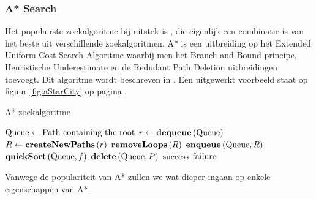 \subsubsection{A* Search}
Het populairste zoekalgoritme bij uitstek is , die eigenlijk een combinatie is van het beste uit verschillende zoekalgoritmen. A* is een uitbreiding op het Extended Uniform Cost Search Algoritme waarbij men het Branch-and-Bound principe, Heuristische Underestimate en de Redudant Path Deletion uitbreidingen toevoegt. Dit algoritme wordt beschreven in . Een uitgewerkt voorbeeld staat op figuur \ref{fig:aStarCity} op pagina \pageref{fig:aStarCity}.
\begin{algorithm}[htb]                      %
\caption{A* zoekalgoritme}          %
\label{alg:aStar}                           %
\begin{algorithmic}[1]                    %
\STATE $\mbox{Queue}\leftarrow\mbox{Path containing the root}$
\WHILE{$\notempty{\queue}\wedge\neg\goalreached{\queue\left[0\right]}$}
\STATE $r\leftarrow\mbox{\bf dequeue}\left( \mbox{Queue} \right)$
\STATE $R\leftarrow\mbox{\bf createNewPaths}\left( r \right)$
\STATE $\mbox{\bf removeLoops}\left( R \right)$
\STATE $\mbox{\bf enqueue}\left( \mbox{Queue},R \right)$
\STATE $\mbox{\bf quickSort}\left( \mbox{Queue},f \right)$
\STATE{}
\STATE $\mbox{\bf delete}\left( \mbox{Queue},P \right)$
\ENDIF
\ENDFOR
\ENDWHILE
\IF{$\goalreached{\queue\left[0\right]}$}
\RETURN $\mbox{success}$
\ELSE
\RETURN $\mbox{failure}$
\ENDIF
\end{algorithmic}
\end{algorithm}
Vanwege de populariteit van A* zullen we wat dieper ingaan op enkele eigenschappen van A*.
